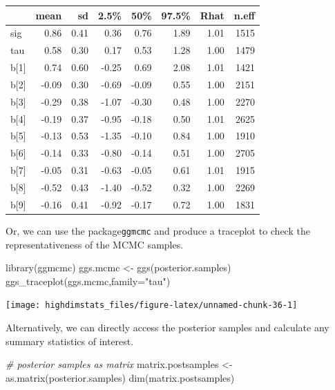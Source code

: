 \documentclass[
]{book}
\newenvironment{Shaded}{\begin{snugshade}}{\end{snugshade}}
\newcommand{\AttributeTok}[1]{\textcolor[rgb]{0.77,0.63,0.00}{#1}}
\newcommand{\CommentTok}[1]{\textcolor[rgb]{0.56,0.35,0.01}{\textit{#1}}}
\newcommand{\FunctionTok}[1]{\textcolor[rgb]{0.00,0.00,0.00}{#1}}
\newcommand{\NormalTok}[1]{#1}
\newcommand{\OtherTok}[1]{\textcolor[rgb]{0.56,0.35,0.01}{#1}}
\newcommand{\StringTok}[1]{\textcolor[rgb]{0.31,0.60,0.02}{#1}}
\begin{document}
\begin{tabular}{l|r|r|r|r|r|r|r}
\hline
  & mean & sd & 2.5\% & 50\% & 97.5\% & Rhat & n.eff\\
\hline
sig & 0.86 & 0.41 & 0.36 & 0.76 & 1.89 & 1.01 & 1515\\
\hline
tau & 0.58 & 0.30 & 0.17 & 0.53 & 1.28 & 1.00 & 1479\\
\hline
b[1] & 0.74 & 0.60 & -0.25 & 0.69 & 2.08 & 1.01 & 1421\\
\hline
b[2] & -0.09 & 0.30 & -0.69 & -0.09 & 0.55 & 1.00 & 2151\\
\hline
b[3] & -0.29 & 0.38 & -1.07 & -0.30 & 0.48 & 1.00 & 2270\\
\hline
b[4] & -0.19 & 0.37 & -0.95 & -0.18 & 0.50 & 1.01 & 2625\\
\hline
b[5] & -0.13 & 0.53 & -1.35 & -0.10 & 0.84 & 1.00 & 1910\\
\hline
b[6] & -0.14 & 0.33 & -0.80 & -0.14 & 0.51 & 1.00 & 2705\\
\hline
b[7] & -0.05 & 0.31 & -0.63 & -0.05 & 0.61 & 1.01 & 1915\\
\hline
b[8] & -0.52 & 0.43 & -1.40 & -0.52 & 0.32 & 1.00 & 2269\\
\hline
b[9] & -0.16 & 0.41 & -0.92 & -0.17 & 0.72 & 1.00 & 1831\\
\hline
\end{tabular}

Or, we can use the package\texttt{ggmcmc} and produce a traceplot to check the representativeness of the MCMC samples.

\begin{Shaded}
\begin{Highlighting}[]
\FunctionTok{library}\NormalTok{(ggmcmc)}
\NormalTok{ggs.mcmc }\OtherTok{\textless{}{-}} \FunctionTok{ggs}\NormalTok{(posterior.samples)}
\FunctionTok{ggs\_traceplot}\NormalTok{(ggs.mcmc,}\AttributeTok{family=}\StringTok{"tau"}\NormalTok{)}
\end{Highlighting}
\end{Shaded}

\begin{center}\texttt{[image: highdimstats\_files/figure-latex/unnamed-chunk-36-1]} \end{center}

Alternatively, we can directly access the posterior samples and calculate any summary statistics of interest.

\begin{Shaded}
\begin{Highlighting}[]
\CommentTok{\# posterior samples as matrix}
\NormalTok{matrix.postsamples }\OtherTok{\textless{}{-}} \FunctionTok{as.matrix}\NormalTok{(posterior.samples)}
\FunctionTok{dim}\NormalTok{(matrix.postsamples)}
\end{Highlighting}
\end{Shaded}
\end{document}
